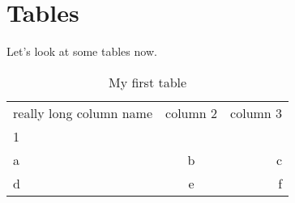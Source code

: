\section{Tables}

Let's look at some tables now.

\begin{table}[ht]
    \centering
    \caption{My first table}
    \begin{tabular}{|p{}|cr|}
        \hline
        really long column name & column 2 & column 3 \\
        1 &  &  \\ %
        \hline
        a & b & c\\
        d & e & f\\
        \hline
    \end{tabular}
    \label{tab:my_label}
\end{table}

